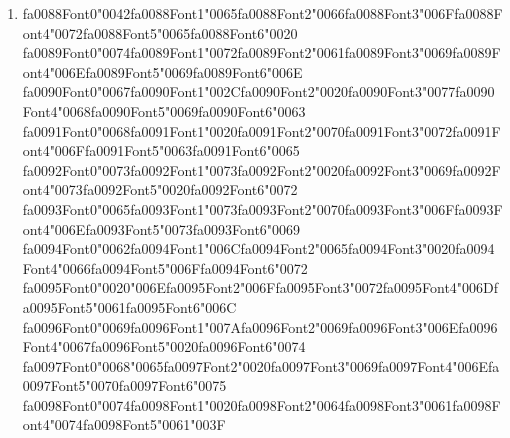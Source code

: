 \documentclass[11pt]{article}
\begin{document}
\begin{enumerate}[label=Q\arabic*., leftmargin=*]
\item {\csname fa0088Font0\endcsname\char"0042}{\csname fa0088Font1\endcsname\char"0065}{\csname fa0088Font2\endcsname\char"0066}{\csname fa0088Font3\endcsname\char"006F}{\csname fa0088Font4\endcsname\char"0072}{\csname fa0088Font5\endcsname\char"0065}{\csname fa0088Font6\endcsname\char"0020} {\csname fa0089Font0\endcsname\char"0074}{\csname fa0089Font1\endcsname\char"0072}{\csname fa0089Font2\endcsname\char"0061}{\csname fa0089Font3\endcsname\char"0069}{\csname fa0089Font4\endcsname\char"006E}{\csname fa0089Font5\endcsname\char"0069}{\csname fa0089Font6\endcsname\char"006E} {\csname fa0090Font0\endcsname\char"0067}{\csname fa0090Font1\endcsname\char"002C}{\csname fa0090Font2\endcsname\char"0020}{\csname fa0090Font3\endcsname\char"0077}{\csname fa0090Font4\endcsname\char"0068}{\csname fa0090Font5\endcsname\char"0069}{\csname fa0090Font6\endcsname\char"0063} {\csname fa0091Font0\endcsname\char"0068}{\csname fa0091Font1\endcsname\char"0020}{\csname fa0091Font2\endcsname\char"0070}{\csname fa0091Font3\endcsname\char"0072}{\csname fa0091Font4\endcsname\char"006F}{\csname fa0091Font5\endcsname\char"0063}{\csname fa0091Font6\endcsname\char"0065} {\csname fa0092Font0\endcsname\char"0073}{\csname fa0092Font1\endcsname\char"0073}{\csname fa0092Font2\endcsname\char"0020}{\csname fa0092Font3\endcsname\char"0069}{\csname fa0092Font4\endcsname\char"0073}{\csname fa0092Font5\endcsname\char"0020}{\csname fa0092Font6\endcsname\char"0072} {\csname fa0093Font0\endcsname\char"0065}{\csname fa0093Font1\endcsname\char"0073}{\csname fa0093Font2\endcsname\char"0070}{\csname fa0093Font3\endcsname\char"006F}{\csname fa0093Font4\endcsname\char"006E}{\csname fa0093Font5\endcsname\char"0073}{\csname fa0093Font6\endcsname\char"0069} {\csname fa0094Font0\endcsname\char"0062}{\csname fa0094Font1\endcsname\char"006C}{\csname fa0094Font2\endcsname\char"0065}{\csname fa0094Font3\endcsname\char"0020}{\csname fa0094Font4\endcsname\char"0066}{\csname fa0094Font5\endcsname\char"006F}{\csname fa0094Font6\endcsname\char"0072} {\csname fa0095Font0\endcsname\char"0020}{\char"006E}{\csname fa0095Font2\endcsname\char"006F}{\csname fa0095Font3\endcsname\char"0072}{\csname fa0095Font4\endcsname\char"006D}{\csname fa0095Font5\endcsname\char"0061}{\csname fa0095Font6\endcsname\char"006C} {\csname fa0096Font0\endcsname\char"0069}{\csname fa0096Font1\endcsname\char"007A}{\csname fa0096Font2\endcsname\char"0069}{\csname fa0096Font3\endcsname\char"006E}{\csname fa0096Font4\endcsname\char"0067}{\csname fa0096Font5\endcsname\char"0020}{\csname fa0096Font6\endcsname\char"0074} {\csname fa0097Font0\endcsname\char"0068}{\char"0065}{\csname fa0097Font2\endcsname\char"0020}{\csname fa0097Font3\endcsname\char"0069}{\csname fa0097Font4\endcsname\char"006E}{\csname fa0097Font5\endcsname\char"0070}{\csname fa0097Font6\endcsname\char"0075} {\csname fa0098Font0\endcsname\char"0074}{\csname fa0098Font1\endcsname\char"0020}{\csname fa0098Font2\endcsname\char"0064}{\csname fa0098Font3\endcsname\char"0061}{\csname fa0098Font4\endcsname\char"0074}{\csname fa0098Font5\endcsname\char"0061}{\char"003F}\\

\end{enumerate}
\end{document}
